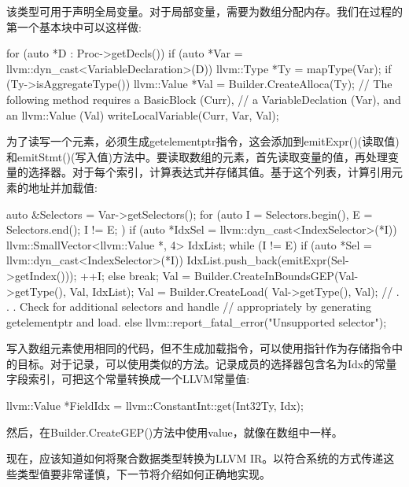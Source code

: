 该类型可用于声明全局变量。对于局部变量，需要为数组分配内存。我们在过程的第一个基本块中可以这样做:

\begin{cpp}
for (auto *D : Proc->getDecls()) {
    if (auto *Var =
            llvm::dyn_cast<VariableDeclaration>(D)) {
        llvm::Type *Ty = mapType(Var);
        if (Ty->isAggregateType()) {
            llvm::Value *Val = Builder.CreateAlloca(Ty);
            // The following method requires a BasicBlock (Curr),
            // a VariableDeclation (Var), and an llvm::Value (Val)
            writeLocalVariable(Curr, Var, Val);
        }
    }
}
\end{cpp}

为了读写一个元素，必须生成getelementptr指令，这会添加到emitExpr()(读取值)和emitStmt()(写入值)方法中。要读取数组的元素，首先读取变量的值，再处理变量的选择器。对于每个索引，计算表达式并存储其值。基于这个列表，计算引用元素的地址并加载值:

\begin{cpp}
auto &Selectors = Var->getSelectors();
for (auto I = Selectors.begin(), E = Selectors.end();
        I != E; ) {
    if (auto *IdxSel =
            llvm::dyn_cast<IndexSelector>(*I)) {
        llvm::SmallVector<llvm::Value *, 4> IdxList;
        while (I != E) {
            if (auto *Sel =
                    llvm::dyn_cast<IndexSelector>(*I)) {
                IdxList.push_back(emitExpr(Sel->getIndex()));
                ++I;
            } else
                break;
        }
        Val = Builder.CreateInBoundsGEP(Val->getType(), Val, IdxList);
        Val = Builder.CreateLoad(
            Val->getType(), Val);
    }
    // . . . Check for additional selectors and handle
    // appropriately by generating getelementptr and load.
    else {
        llvm::report_fatal_error("Unsupported selector");
    }
}
\end{cpp}

写入数组元素使用相同的代码，但不生成加载指令，可以使用指针作为存储指令中的目标。对于记录，可以使用类似的方法。记录成员的选择器包含名为Idx的常量字段索引，可把这个常量转换成一个LLVM常量值:

\begin{cpp}
llvm::Value *FieldIdx = llvm::ConstantInt::get(Int32Ty, Idx);
\end{cpp}

然后，在Builder.CreateGEP()方法中使用value，就像在数组中一样。

现在，应该知道如何将聚合数据类型转换为LLVM IR。以符合系统的方式传递这些类型值要非常谨慎，下一节将介绍如何正确地实现。













